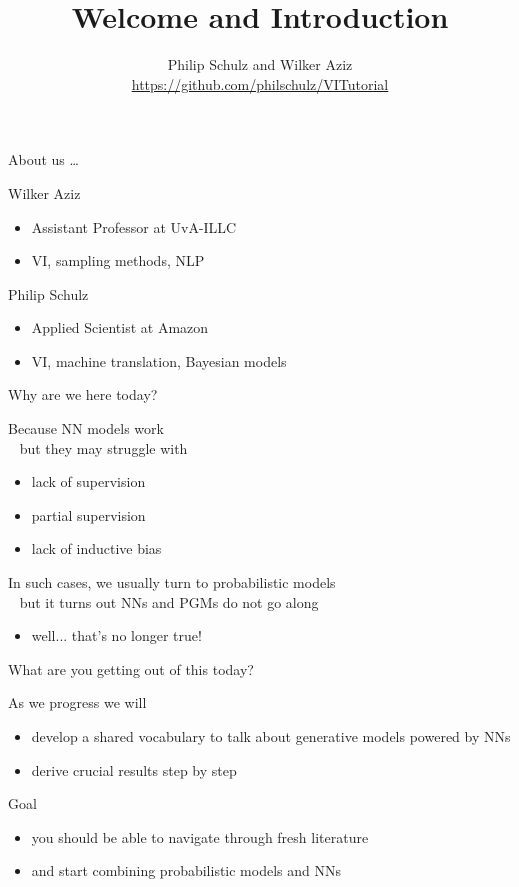 \documentclass[14pt]{beamer}
\title{Welcome and Introduction}
\date{}
\author[Schulz and Aziz]{Philip Schulz and Wilker Aziz \\
\url{https://github.com/philschulz/VITutorial}}
\begin{document}
\frame{\titlepage}

\begin{frame}{About us \ldots}
\begin{block}{Wilker Aziz}
\begin{itemize}
\item Assistant Professor at UvA-ILLC
\item VI, sampling methods, NLP
\end{itemize}
\end{block}

\begin{block}{Philip Schulz}
\begin{itemize}
\item Applied Scientist at Amazon
\item VI, machine translation, Bayesian models
\end{itemize}
\end{block}
\end{frame}

\begin{frame}{Why are we here today?}

Because NN models work \\ \pause
~ but they may struggle with
\begin{itemize}
	\item lack of supervision
	\item partial supervision
	\item lack of inductive bias
\end{itemize}
\pause

In such cases, we usually turn to probabilistic models \\ \pause
~ but it turns out NNs and PGMs do not go along
\begin{itemize}
	\item well... \pause that's no longer true!
\end{itemize}

\end{frame}

\begin{frame}{What are you getting out of this today?}

As we progress we will
\begin{itemize}
	\item develop a shared vocabulary to talk about generative models powered by NNs
	\item derive crucial results step by step
\end{itemize}

\pause

Goal
\begin{itemize}
	\item you should be able to navigate through fresh literature
	\item and start combining probabilistic models and NNs
\end{itemize}

\end{frame}
\end{document}
